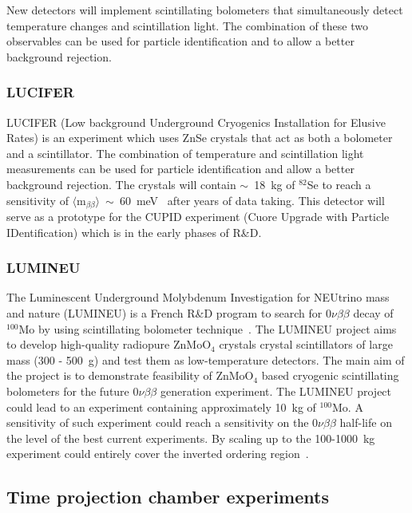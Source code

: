 \documentclass[main.tex]{subfiles}
\begin{document}
New detectors will implement scintillating bolometers that simultaneously detect temperature changes and scintillation light. The combination of these two observables can be used for particle identification and to allow a better background rejection.  


\subsubsection{LUCIFER}


\NI LUCIFER (Low background Underground Cryogenics Installation for Elusive Rates) is an experiment which uses ZnSe crystals that act as both a bolometer and a scintillator. The combination of temperature and scintillation light measurements can be used for particle identification and allow a better background rejection. The crystals will contain $\sim$~18~kg of $^{\text{82}}$Se to reach a sensitivity of $\langle \text{m}_{\beta\beta} \rangle$~$\sim$~60~meV~\cite{LUCIFER} after years of data taking. This detector will serve as a prototype for the CUPID experiment (Cuore Upgrade with Particle IDentification) which is in the early phases of R\&D.


\subsubsection{LUMINEU}


\NI The Luminescent Underground Molybdenum Investigation for NEUtrino mass and nature (LUMINEU) is a French R\&D program to search for 0$\nu\beta\beta$ decay of $^{\text{100}}$Mo by using scintillating bolometer technique~\cite{LUMINEU}. The LUMINEU project aims to develop high-quality radiopure ZnMoO$_\text{4}$ crystals crystal scintillators of large mass (300 - 500~g) and test them as low-temperature detectors. The main aim of the project is to demonstrate feasibility of ZnMoO$_\text{4}$ based  cryogenic scintillating  bolometers for the future 0$\nu\beta\beta$ generation experiment. The LUMINEU project could lead to an experiment containing approximately 10~kg of $^{\text{100}}$Mo. A sensitivity of such experiment could reach a sensitivity on the 0$\nu\beta\beta$ half-life on the level of the best current experiments. By scaling up to the 100-1000~kg experiment could entirely cover the inverted ordering region~\cite{LUMINEU}.



\subsection{Time projection chamber experiments}
\end{document}
